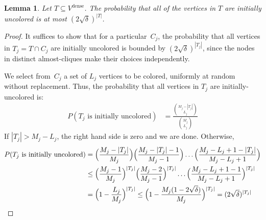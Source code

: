 \documentclass[11pt]{amsart}
\newtheorem{lemma}[theorem]{Lemma}
\begin{document}
\begin{lemma}
\label{prop2}
Let $T  \subseteq V^{\text{dense}}$. The probability that all of the vertices in $T$ are initially uncolored is at most $(2 \sqrt{\delta})^{|T|}$.
\end{lemma}
\begin{proof}
It suffices to show that for a particular~$C_j$, the probability that all vertices in $T_j = T \cap C_j$ are initially uncolored is bounded by $(2 \sqrt{\delta})^{|T_j|}$, since the nodes in distinct almost-cliques make their choices independently.

We select from~$C_j$ a set of $L_j$ vertices to be colored, uniformly at random without replacement. Thus, the probability that all vertices in $T_j$ are initially-uncolored is:
{\allowdisplaybreaks
\begin{align*}
P( \text{$T_j$ is initially uncolored}) &= \frac{\binom{M_j-|T_j|}{L_j}}{\binom{M_j}{L_j}} 
\end{align*}
If $|T_j| > M_j-L_j$, the right hand side is zero and we are done. Otherwise,
\begin{align*}
P( \text{$T_j$ is initially uncolored}) &= \Bigl(\frac{M_j - |T_j|}{M_j}\Bigr) \Bigl(\frac{M_j - |T_j| - 1}{M_j - 1}\Bigr) \dots \Bigl(\frac{M_j-L_j+1 - |T_j|}{M_j - L_j + 1}\Bigr) \\
&\leq \Bigl(\frac{M_j - 1}{M_j}\Bigr)^{|T_j|} \Bigl( \frac{M_j-2}{M_j-1} \Bigr)^{|T_j|} \dots \Bigl(\frac{M_j-L_j+1 - 1}{M_j - L_j + 1}\Bigr)^{|T_j|} \\
&=\Bigl(1 - \frac{L_j}{M_j} \Bigr)^{|T_j|} \leq \Bigl (1 - \frac{ M_j (1 - 2 \sqrt{\delta} ) }{M_j} \Bigr)^{|T_j|} = ( 2 \sqrt{\delta} )^{|T_j|}
\end{align*}
}
\end{proof}
\end{document}
